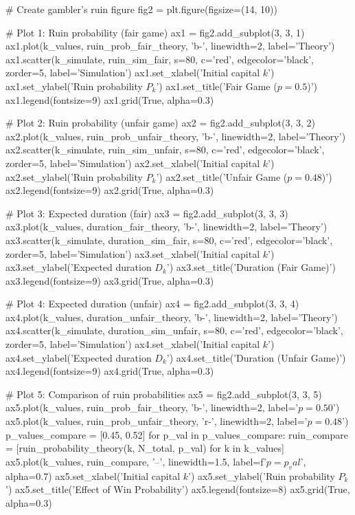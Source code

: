 \documentclass[a4paper, 11pt]{article}
\begin{document}
\begin{pycode}
# Create gambler's ruin figure
fig2 = plt.figure(figsize=(14, 10))

# Plot 1: Ruin probability (fair game)
ax1 = fig2.add_subplot(3, 3, 1)
ax1.plot(k_values, ruin_prob_fair_theory, 'b-', linewidth=2, label='Theory')
ax1.scatter(k_simulate, ruin_sim_fair, s=80, c='red', edgecolor='black',
            zorder=5, label='Simulation')
ax1.set_xlabel('Initial capital $k$')
ax1.set_ylabel('Ruin probability $P_k$')
ax1.set_title('Fair Game ($p=0.5$)')
ax1.legend(fontsize=9)
ax1.grid(True, alpha=0.3)

# Plot 2: Ruin probability (unfair game)
ax2 = fig2.add_subplot(3, 3, 2)
ax2.plot(k_values, ruin_prob_unfair_theory, 'b-', linewidth=2, label='Theory')
ax2.scatter(k_simulate, ruin_sim_unfair, s=80, c='red', edgecolor='black',
            zorder=5, label='Simulation')
ax2.set_xlabel('Initial capital $k$')
ax2.set_ylabel('Ruin probability $P_k$')
ax2.set_title('Unfair Game ($p=0.48$)')
ax2.legend(fontsize=9)
ax2.grid(True, alpha=0.3)

# Plot 3: Expected duration (fair)
ax3 = fig2.add_subplot(3, 3, 3)
ax3.plot(k_values, duration_fair_theory, 'b-', linewidth=2, label='Theory')
ax3.scatter(k_simulate, duration_sim_fair, s=80, c='red', edgecolor='black',
            zorder=5, label='Simulation')
ax3.set_xlabel('Initial capital $k$')
ax3.set_ylabel('Expected duration $D_k$')
ax3.set_title('Duration (Fair Game)')
ax3.legend(fontsize=9)
ax3.grid(True, alpha=0.3)

# Plot 4: Expected duration (unfair)
ax4 = fig2.add_subplot(3, 3, 4)
ax4.plot(k_values, duration_unfair_theory, 'b-', linewidth=2, label='Theory')
ax4.scatter(k_simulate, duration_sim_unfair, s=80, c='red', edgecolor='black',
            zorder=5, label='Simulation')
ax4.set_xlabel('Initial capital $k$')
ax4.set_ylabel('Expected duration $D_k$')
ax4.set_title('Duration (Unfair Game)')
ax4.legend(fontsize=9)
ax4.grid(True, alpha=0.3)

# Plot 5: Comparison of ruin probabilities
ax5 = fig2.add_subplot(3, 3, 5)
ax5.plot(k_values, ruin_prob_fair_theory, 'b-', linewidth=2, label='$p=0.50$')
ax5.plot(k_values, ruin_prob_unfair_theory, 'r-', linewidth=2, label='$p=0.48$')
p_values_compare = [0.45, 0.52]
for p_val in p_values_compare:
    ruin_compare = [ruin_probability_theory(k, N_total, p_val) for k in k_values]
    ax5.plot(k_values, ruin_compare, '--', linewidth=1.5,
             label=f'$p={p_val}$', alpha=0.7)
ax5.set_xlabel('Initial capital $k$')
ax5.set_ylabel('Ruin probability $P_k$')
ax5.set_title('Effect of Win Probability')
ax5.legend(fontsize=8)
ax5.grid(True, alpha=0.3)


\end{pycode}
\end{document}
